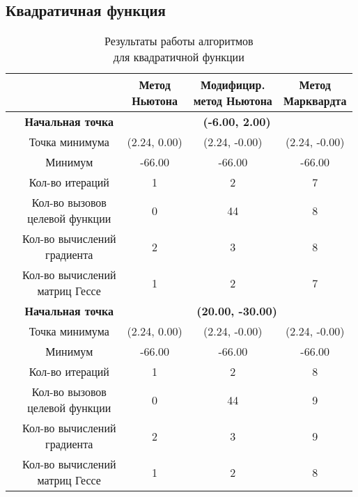 \subsection{Квадратичная функция}

\begin{table}[H]
        \centering
        \vspace*{-1.5em}
        \caption{Результаты работы алгоритмов\\для квадратичной функции}
        \footnotesize
        \begin{tabular}{|c|c|c|c|c|}
        \hline
        & &\makecell{Метод\\Ньютона} &\makecell{Модифицир.\\метод Ньютона} &\makecell{Метод\\Марквардта} \\
        \hline
	\multirow{12}{*}{\rotatebox[origin=c]{90}{$\varepsilon = 0.01$}}&\textbf{Начальная точка} &\multicolumn{3}{c|}{\textbf{(-6.00, 2.00)}}\\
	\cline{2-5}
	&Точка минимума &(2.24, 0.00) &(2.24, -0.00) &(2.24, -0.00) \\ 
	\cline{2-5}
	&Минимум &-66.00 &-66.00 &-66.00 \\ 
	\cline{2-5}
	&Кол-во итераций &1 &2 &7 \\ 
	\cline{2-5}
	&\makecell{Кол-во вызовов\\целевой функции} &0 &44 &8 \\ 
	\cline{2-5}
	&\makecell{Кол-во вычислений\\градиента} &2 &3 &8 \\ 
	\cline{2-5}
	&\makecell{Кол-во вычислений\\матриц Гессе} &1 &2 &7 \\ 
	\cline{2-5}
\cline{2-5}&\textbf{Начальная точка} &\multicolumn{3}{c|}{\textbf{(20.00, -30.00)}}\\
	\cline{2-5}
	&Точка минимума &(2.24, 0.00) &(2.24, -0.00) &(2.24, -0.00) \\ 
	\cline{2-5}
	&Минимум &-66.00 &-66.00 &-66.00 \\ 
	\cline{2-5}
	&Кол-во итераций &1 &2 &8 \\ 
	\cline{2-5}
	&\makecell{Кол-во вызовов\\целевой функции} &0 &44 &9 \\ 
	\cline{2-5}
	&\makecell{Кол-во вычислений\\градиента} &2 &3 &9 \\ 
	\cline{2-5}
	&\makecell{Кол-во вычислений\\матриц Гессе} &1 &2 &8 \\ 

\end{tabular}
\end{table}
